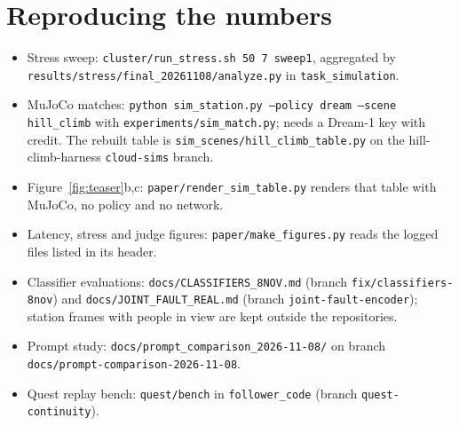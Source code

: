\documentclass[10pt]{article}
\newcommand{\dream}{Dream-1}
\begin{document}
\section{Reproducing the numbers}
\begin{sloppypar}
\begin{itemize}
  \item Stress sweep: \texttt{cluster/run\_stress.sh 50 7 sweep1}, aggregated by \texttt{results/stress/final\_20261108/analyze.py} in
  \texttt{task\_simulation}.
  \item MuJoCo matches: \texttt{python sim\_station.py --policy dream --scene hill\_climb} with \texttt{experiments/sim\_match.py}; needs a \dream{}
  key with credit. The rebuilt table is \texttt{sim\_scenes/hill\_climb\_table.py} on the hill-climb-harness \texttt{cloud-sims} branch.
  \item Figure~\ref{fig:teaser}b,c: \texttt{paper/render\_sim\_table.py} renders that table with MuJoCo, no policy and no network.
  \item Latency, stress and judge figures: \texttt{paper/make\_figures.py} reads the logged files listed in its header.
  \item Classifier evaluations: \texttt{docs/CLASSIFIERS\_8NOV.md} (branch \texttt{fix/classifiers-8nov}) and \texttt{docs/JOINT\_FAULT\_REAL.md}
  (branch \texttt{joint-fault-encoder}); station frames with people in view are kept outside the repositories.
  \item Prompt study: \texttt{docs/prompt\_comparison\_2026-11-08/} on branch \texttt{docs/prompt-comparison-2026-11-08}.
  \item Quest replay bench: \texttt{quest/bench} in \texttt{follower\_code} (branch \texttt{quest-continuity}).
\end{itemize}
\end{sloppypar}
\end{document}
